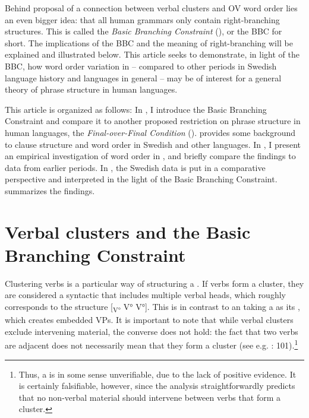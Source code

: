 \documentclass[output=paper, colorlinks, citecolor=brown]{langscibook}
\begin{document}
Behind  proposal of a connection between verbal clusters and OV word order lies an even bigger idea: that all human grammars only contain right-branching structures. This is called the \textit{Basic Branching Constraint} (\citealt{Haider2010, Haider2013}), or the BBC for short. The implications of the BBC and the meaning of right-branching will be explained and illustrated below. This article seeks to demonstrate, in light of the BBC, how  word order variation in  – compared to other periods in Swedish language history and  languages in general – may be of interest for a general theory of phrase structure in human languages.


This article is organized as follows: In , I introduce the Basic Branching Constraint and compare it to another proposed restriction on phrase structure in human languages, the \textit{Final-over-Final Condition} (\citealt{BiberauerEtAl2014,SheehanEtAl2017}).  provides some background to clause structure and  word order in Swedish and other  languages. In , I present an empirical investigation of  word order in , and briefly compare the findings to data from earlier periods. In , the Swedish data is put in a comparative perspective and interpreted in the light of the Basic Branching Constraint.  summarizes the findings.


\section{Verbal clusters and the Basic Branching Constraint}\label{sec:sangfelt:2}

Clustering verbs is a particular way of structuring a . If verbs form a cluster, they are considered a syntactic  that includes multiple verbal heads, which roughly corresponds to the structure [\textsubscript{V°} V° V°]. This is in contrast to an  taking a  as its , which creates embedded VPs. It is important to note that while verbal clusters exclude intervening material, the converse does not hold: the fact that two verbs are adjacent does not necessarily mean that they form a cluster (see e.g. \citealt{Sheehan2017Final}: 101).\footnote{Thus, a  is in some sense unverifiable, due to the lack of positive evidence. It is certainly falsifiable, however, since the analysis straightforwardly predicts that no non-verbal material should intervene between verbs that form a cluster.}
\end{document}

